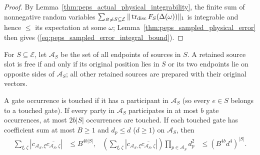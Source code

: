 \begin{proof}\leanok
    By Lemma~\ref{thm:peps_actual_physical_integrability}, the finite sum of
    nonnegative random variables $\sum_{\varnothing\ne S\subseteq\mathcal E}\|\operatorname{tr}_{\rm disc}F_S(\Delta(\omega))\|_1$
    is integrable and hence $\le$ its expectation at some $\omega$;
    Lemma~\ref{thm:peps_sampled_physical_error} then gives (\ref{eq:peps_sampled_error_integral_bound}).
\end{proof}

\begin{definition}
    \label{def:peps_corrected_free_sources}
    \leanok
    For $S\subseteq\mathcal E$, let $\mathcal A_S$ be the set of all endpoints
    of sources in $S$. A retained source slot is free if and only if its
    original position lies in $S$ or its two endpoints lie on opposite sides of
    $\mathcal A_S$; all other retained sources are prepared with their original
    vectors.
\end{definition}

\begin{lemma}
    \label{thm:peps_actual_source_lifetime_cost}
    \leanok
    A gate occurrence is touched if it has a participant in $\mathcal A_S$ (so
    every $e\in S$ belongs to a touched gate). If every party in $\mathcal A_S$
    participates in at most $b$ gate occurrences, at most $2b|S|$ occurrences
    are touched. If each touched gate has coefficient sum at most $B\geq1$ and
    $d_p\leq d$ ($d\ge 1$) on $\mathcal A_S$, then
    \begin{align}
        \sum_{\xi,\zeta}|c_{\mathcal A_S,\xi}\overline{c_{\mathcal A_S,\zeta}}|
         & \leq B^{4b|S|},         &
        \left(\sum_{\xi,\zeta}|c_{\mathcal A_S,\xi}
        \overline{c_{\mathcal A_S,\zeta}}|\right)
        \prod_{p\in\mathcal A_S}d_p^2
         & \leq (B^{4b}d^4)^{|S|}.
        \label{eq:peps_actual_source_lifetime_cost}
    \end{align}
\end{lemma}

